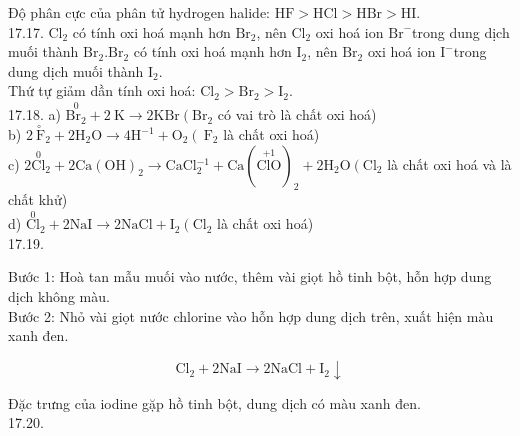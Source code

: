 \documentclass[10pt]{article}
\begin{document}
Độ phân cực của phân tử hydrogen halide: $\mathrm{HF}>\mathrm{HCl}>\mathrm{HBr}>\mathrm{HI}$.\\
17.17. $\mathrm{Cl}_{2}$ có tính oxi hoá mạnh hơn $\mathrm{Br}_{2}$, nên $\mathrm{Cl}_{2}$ oxi hoá ion $\mathrm{Br}^{-}$trong dung dịch muối thành $\mathrm{Br}_{2} . \mathrm{Br}_{2}$ có tính oxi hoá mạnh hơn $\mathrm{I}_{2}$, nên $\mathrm{Br}_{2}$ oxi hoá ion $\mathrm{I}^{-}$trong dung dịch muối thành $\mathrm{I}_{2}$.\\
Thứ tự giảm dần tính oxi hoá: $\mathrm{Cl}_{2}>\mathrm{Br}_{2}>\mathrm{I}_{2}$.\\
17.18. a) $\stackrel{0}{\mathrm{Br}_{2}}+2 \mathrm{~K} \rightarrow 2 \mathrm{KBr}\left(\mathrm{Br}_{2}\right.$ có vai trò là chất oxi hoá)\\
b) $2 \stackrel{\circ}{\mathrm{~F}}_{2}+2 \mathrm{H}_{2} \mathrm{O} \rightarrow 4 \mathrm{H}^{-1}+\mathrm{O}_{2}\left(\mathrm{~F}_{2}\right.$ là chất oxi hoá)\\
c) $2 \stackrel{0}{\mathrm{Cl}}{ }_{2}+2 \mathrm{Ca}(\mathrm{OH})_{2} \rightarrow \mathrm{CaCl}{ }_{2}^{-1}+\mathrm{Ca}(\stackrel{+1}{\mathrm{ClO}})_{2}+2 \mathrm{H}_{2} \mathrm{O}\left(\mathrm{Cl}_{2}\right.$ là chất oxi hoá và là chất khử)\\
d) $\stackrel{0}{\mathrm{Cl}}_{2}+2 \mathrm{NaI} \rightarrow 2 \mathrm{NaCl}+\mathrm{I}_{2}\left(\mathrm{Cl}_{2}\right.$ là chất oxi hoá)\\
17.19.

Bước 1: Hoà tan mẫu muối vào nước, thêm vài giọt hồ tinh bột, hỗn hợp dung dịch không màu.\\
Bước 2: Nhỏ vài giọt nước chlorine vào hỗn hợp dung dịch trên, xuất hiện màu xanh đen.

$$
\mathrm{Cl}_{2}+2 \mathrm{NaI} \rightarrow 2 \mathrm{NaCl}+\mathrm{I}_{2} \downarrow
$$

Đặc trưng của iodine gặp hồ tinh bột, dung dịch có màu xanh đen.\\
17.20.
\end{document}
